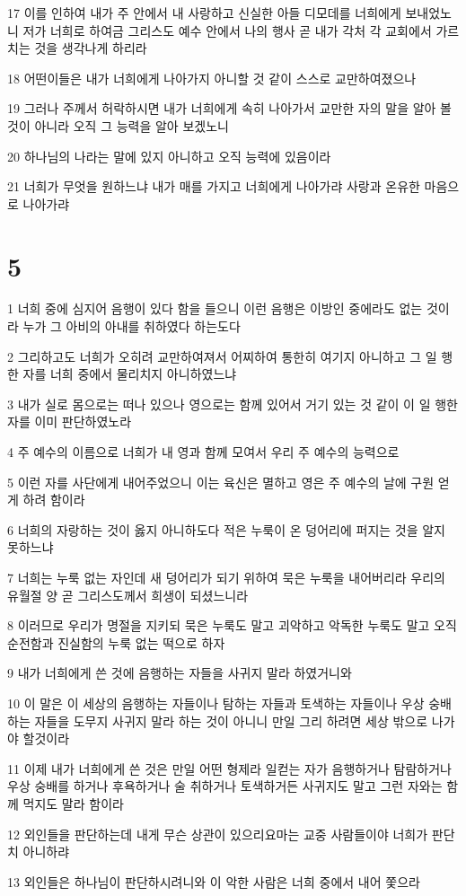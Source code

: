 \par 17 이를 인하여 내가 주 안에서 내 사랑하고 신실한 아들 디모데를 너희에게 보내었노니 저가 너희로 하여금 그리스도 예수 안에서 나의 행사 곧 내가 각처 각 교회에서 가르치는 것을 생각나게 하리라
\par 18 어떤이들은 내가 너희에게 나아가지 아니할 것 같이 스스로 교만하여졌으나
\par 19 그러나 주께서 허락하시면 내가 너희에게 속히 나아가서 교만한 자의 말을 알아 볼것이 아니라 오직 그 능력을 알아 보겠노니
\par 20 하나님의 나라는 말에 있지 아니하고 오직 능력에 있음이라
\par 21 너희가 무엇을 원하느냐 내가 매를 가지고 너희에게 나아가랴 사랑과 온유한 마음으로 나아가랴

\chapter{5}

\par 1 너희 중에 심지어 음행이 있다 함을 들으니 이런 음행은 이방인 중에라도 없는 것이라 누가 그 아비의 아내를 취하였다 하는도다
\par 2 그리하고도 너희가 오히려 교만하여져서 어찌하여 통한히 여기지 아니하고 그 일 행한 자를 너희 중에서 물리치지 아니하였느냐
\par 3 내가 실로 몸으로는 떠나 있으나 영으로는 함께 있어서 거기 있는 것 같이 이 일 행한 자를 이미 판단하였노라
\par 4 주 예수의 이름으로 너희가 내 영과 함께 모여서 우리 주 예수의 능력으로
\par 5 이런 자를 사단에게 내어주었으니 이는 육신은 멸하고 영은 주 예수의 날에 구원 얻게 하려 함이라
\par 6 너희의 자랑하는 것이 옳지 아니하도다 적은 누룩이 온 덩어리에 퍼지는 것을 알지 못하느냐
\par 7 너희는 누룩 없는 자인데 새 덩어리가 되기 위하여 묵은 누룩을 내어버리라 우리의 유월절 양 곧 그리스도께서 희생이 되셨느니라
\par 8 이러므로 우리가 명절을 지키되 묵은 누룩도 말고 괴악하고 악독한 누룩도 말고 오직 순전함과 진실함의 누룩 없는 떡으로 하자
\par 9 내가 너희에게 쓴 것에 음행하는 자들을 사귀지 말라 하였거니와
\par 10 이 말은 이 세상의 음행하는 자들이나 탐하는 자들과 토색하는 자들이나 우상 숭배하는 자들을 도무지 사귀지 말라 하는 것이 아니니 만일 그리 하려면 세상 밖으로 나가야 할것이라
\par 11 이제 내가 너희에게 쓴 것은 만일 어떤 형제라 일컫는 자가 음행하거나 탐람하거나 우상 숭배를 하거나 후욕하거나 술 취하거나 토색하거든 사귀지도 말고 그런 자와는 함께 먹지도 말라 함이라
\par 12 외인들을 판단하는데 내게 무슨 상관이 있으리요마는 교중 사람들이야 너희가 판단치 아니하랴
\par 13 외인들은 하나님이 판단하시려니와 이 악한 사람은 너희 중에서 내어 쫓으라

